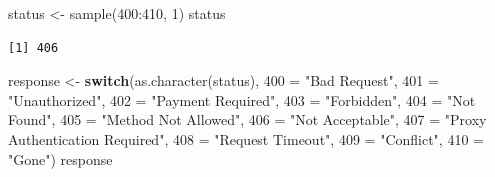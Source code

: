 \documentclass[
]{book}
\newenvironment{Shaded}{\begin{snugshade}}{\end{snugshade}}
\newcommand{\AttributeTok}[1]{\textcolor[rgb]{0.77,0.63,0.00}{#1}}
\newcommand{\ControlFlowTok}[1]{\textcolor[rgb]{0.13,0.29,0.53}{\textbf{#1}}}
\newcommand{\DecValTok}[1]{\textcolor[rgb]{0.00,0.00,0.81}{#1}}
\newcommand{\FunctionTok}[1]{\textcolor[rgb]{0.00,0.00,0.00}{#1}}
\newcommand{\NormalTok}[1]{#1}
\newcommand{\OtherTok}[1]{\textcolor[rgb]{0.56,0.35,0.01}{#1}}
\newcommand{\SpecialCharTok}[1]{\textcolor[rgb]{0.00,0.00,0.00}{#1}}
\newcommand{\StringTok}[1]{\textcolor[rgb]{0.31,0.60,0.02}{#1}}
\begin{document}
\begin{Shaded}
\begin{Highlighting}[]
\NormalTok{status }\OtherTok{\textless{}{-}} \FunctionTok{sample}\NormalTok{(}\DecValTok{400}\SpecialCharTok{:}\DecValTok{410}\NormalTok{, }\DecValTok{1}\NormalTok{)}
\NormalTok{status}
\end{Highlighting}
\end{Shaded}

\begin{verbatim}
[1] 406
\end{verbatim}

\begin{Shaded}
\begin{Highlighting}[]
\NormalTok{response }\OtherTok{\textless{}{-}} \ControlFlowTok{switch}\NormalTok{(}\FunctionTok{as.character}\NormalTok{(status),}
                   \StringTok{\textasciigrave{}}\AttributeTok{400}\StringTok{\textasciigrave{}} \OtherTok{=} \StringTok{"Bad Request"}\NormalTok{,}
                   \StringTok{\textasciigrave{}}\AttributeTok{401}\StringTok{\textasciigrave{}} \OtherTok{=} \StringTok{"Unauthorized"}\NormalTok{,}
                   \StringTok{\textasciigrave{}}\AttributeTok{402}\StringTok{\textasciigrave{}} \OtherTok{=} \StringTok{"Payment Required"}\NormalTok{,}
                   \StringTok{\textasciigrave{}}\AttributeTok{403}\StringTok{\textasciigrave{}} \OtherTok{=} \StringTok{"Forbidden"}\NormalTok{,}
                   \StringTok{\textasciigrave{}}\AttributeTok{404}\StringTok{\textasciigrave{}} \OtherTok{=} \StringTok{"Not Found"}\NormalTok{,}
                   \StringTok{\textasciigrave{}}\AttributeTok{405}\StringTok{\textasciigrave{}} \OtherTok{=} \StringTok{"Method Not Allowed"}\NormalTok{,}
                   \StringTok{\textasciigrave{}}\AttributeTok{406}\StringTok{\textasciigrave{}} \OtherTok{=} \StringTok{"Not Acceptable"}\NormalTok{,}
                   \StringTok{\textasciigrave{}}\AttributeTok{407}\StringTok{\textasciigrave{}} \OtherTok{=} \StringTok{"Proxy Authentication Required"}\NormalTok{,}
                   \StringTok{\textasciigrave{}}\AttributeTok{408}\StringTok{\textasciigrave{}} \OtherTok{=} \StringTok{"Request Timeout"}\NormalTok{,}
                   \StringTok{\textasciigrave{}}\AttributeTok{409}\StringTok{\textasciigrave{}} \OtherTok{=} \StringTok{"Conflict"}\NormalTok{,}
                   \StringTok{\textasciigrave{}}\AttributeTok{410}\StringTok{\textasciigrave{}} \OtherTok{=} \StringTok{"Gone"}\NormalTok{)}
\NormalTok{response}
\end{Highlighting}
\end{Shaded}
\end{document}
